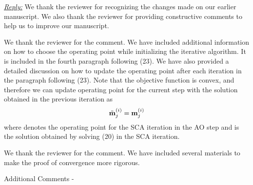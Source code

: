 
\vspace{1eM}
\underline{\textit{Reply:}} We thank the reviewer for recognizing the changes made on our earlier manuscript. We also thank the reviewer for providing constructive comments to help us to improve our manuscript.

\begin{enumerate}
 

\resp We thank the reviewer for the comment. We have included additional information on how to choose the operating point while initializing the iterative algorithm. It is included in the fourth paragraph following (23). We have also provided a detailed discussion on how to update the operating point after each iteration in the paragraph following (23). Note that the objective function is convex, and therefore we can update operating point for the current step with the solution obtained in the previous iteration as
\begin{equation}
\tilde{\mathbf{m}}_{j}^{(i)} = \mathbf{m}_{j}^{(i)}
\end{equation}
where  denotes the operating point for the  \ac{SCA} iteration in the  \ac{AO} step and  is the solution obtained by solving (20) in the  \ac{SCA} iteration.

 

\resp We thank the reviewer for the comment. We have included several materials to make the proof of convergence more rigorous.

Additional Comments - 

\begin{enumerate}
	

\end{enumerate}
\end{enumerate}
